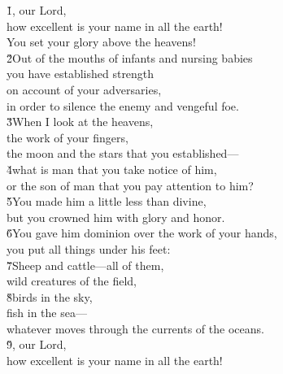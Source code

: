 
\begin{poetry}
\poeml \v{1}, our Lord, \\
\poemll    how excellent is your name in all the earth! \\
\poemlll       You set your glory above the heavens! \\
\poeml \v{2}Out of the mouths of infants and nursing babies \\
\poemll    you have established strength \\
\poemlll       on account of your adversaries, \\
\poeml in order to silence the enemy and vengeful foe. \\
\poeml \v{3}When I look at the heavens, \\
\poemll    the work of your fingers, \\
\poemlll       the moon and the stars that you established--- \\
\poeml \v{4}what is man that you take notice of him, \\
\poemll    or the son of man that you pay attention to him? \\
\poeml \v{5}You made him a little less than divine, \\
\poemll    but you crowned him with glory and honor. \\
\poeml \v{6}You gave him dominion over the work of your hands, \\
\poemll    you put all things under his feet: \\
\poeml \v{7}Sheep and cattle---all of them, \\
\poemll    wild creatures of the field, \\
\poeml \v{8}birds in the sky, \\
\poemll    fish in the sea--- \\
\poemlll       whatever moves through the currents of the oceans. \\
\poeml \v{9}, our Lord, \\
\poemll    how excellent is your name in all the earth!
\end{poetry}

